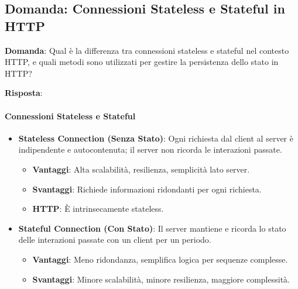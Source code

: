 
\subsection*{Domanda: Connessioni Stateless e Stateful in HTTP}

\textbf{Domanda}: Qual è la differenza tra connessioni stateless e stateful nel contesto HTTP, e quali metodi sono utilizzati per gestire la persistenza dello stato in HTTP?

\textbf{Risposta}:

\paragraph{Connessioni Stateless e Stateful}
\begin{itemize}
    \item \textbf{Stateless Connection (Senza Stato)}: Ogni richiesta dal client al server è indipendente e autocontenuta; il server non ricorda le interazioni passate.
    \begin{itemize}
        \item \textbf{Vantaggi}: Alta scalabilità, resilienza, semplicità lato server.
        \item \textbf{Svantaggi}: Richiede informazioni ridondanti per ogni richiesta.
        \item \textbf{HTTP}: È intrinsecamente stateless.
    \end{itemize}
    \item \textbf{Stateful Connection (Con Stato)}: Il server mantiene e ricorda lo stato delle interazioni passate con un client per un periodo.
    \begin{itemize}
        \item \textbf{Vantaggi}: Meno ridondanza, semplifica logica per sequenze complesse.
        \item \textbf{Svantaggi}: Minore scalabilità, minore resilienza, maggiore complessità.
    \end{itemize}
\end{itemize}
